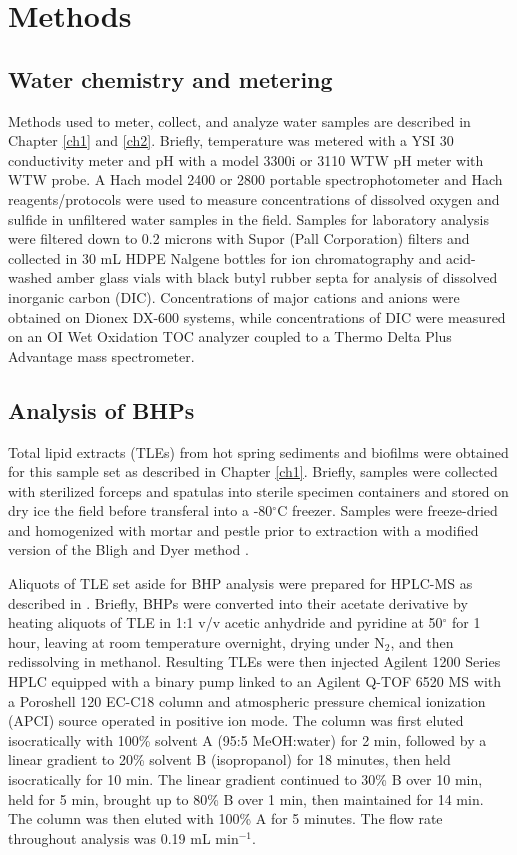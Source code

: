 \section{Methods}

\subsection{Water chemistry and metering}
Methods used to meter, collect, and analyze water samples are described in Chapter \ref{ch1} and \ref{ch2}. Briefly, temperature was metered with a YSI 30 conductivity meter and pH with a model 3300i or 3110 WTW pH meter with WTW probe. A Hach model 2400 or 2800 portable spectrophotometer and Hach reagents/protocols were used to measure concentrations of dissolved oxygen and sulfide in unfiltered water samples in the field. Samples for laboratory analysis were filtered down to 0.2 microns with Supor (Pall Corporation) filters and collected in 30 mL HDPE Nalgene bottles for ion chromatography and acid-washed amber glass vials with black butyl rubber septa for analysis of dissolved inorganic carbon (DIC). Concentrations of major cations and anions were obtained on Dionex DX-600 systems, while concentrations of DIC were measured on an OI Wet Oxidation TOC analyzer coupled to a Thermo Delta Plus Advantage mass spectrometer.

\subsection{Analysis of BHPs} Total lipid extracts (TLEs) from hot spring sediments and biofilms were obtained for this sample set as described in Chapter \ref{ch1}. Briefly, samples were collected with sterilized forceps and spatulas into sterile specimen containers and stored on dry ice the field before transferal into a -80$^{\circ}$C freezer. Samples were freeze-dried and homogenized with mortar and pestle prior to extraction with a modified version of the Bligh and Dyer method \citep{white1998signature}.

Aliquots of TLE set aside for BHP analysis were prepared for HPLC-MS as described in \cite{talbot2003atmospheric}. Briefly, BHPs were converted into their acetate derivative by heating aliquots of TLE in 1:1 v/v acetic anhydride and pyridine at 50$^{\circ}$ for 1 hour, leaving at room temperature overnight, drying under N$_2$, and then redissolving in methanol. Resulting TLEs were then injected Agilent 1200 Series HPLC equipped with a binary pump linked to an Agilent Q-TOF 6520 MS with a Poroshell 120 EC-C18 column and atmospheric pressure chemical ionization (APCI) source operated in positive ion mode. The column was first eluted isocratically with 100\% solvent A (95:5 MeOH:water) for 2 min, followed by a linear gradient to 20\% solvent B (isopropanol) for 18 minutes, then held isocratically for 10 min. The linear gradient continued to 30\% B over 10 min, held for 5 min, brought up to 80\% B over 1 min, then maintained for 14 min. The column was then eluted with 100\% A for 5 minutes. The flow rate throughout analysis was 0.19 mL min$^{-1}$.

